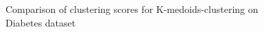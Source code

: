\begin{figure}[H]
	\centering
	
	\caption{Comparison of clustering scores for K-medoids-clustering on Diabetes dataset}%
\end{figure}

